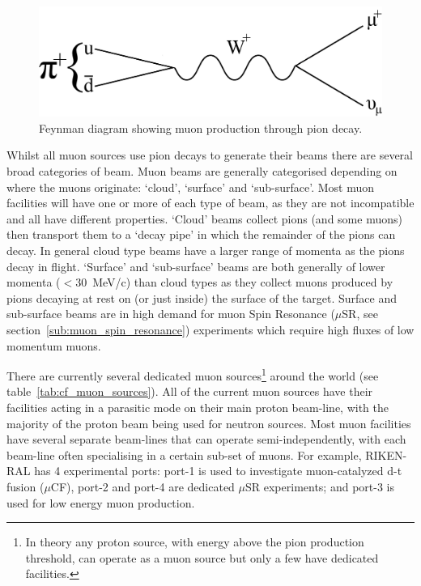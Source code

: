 \begin{figure}[hptb]
  \centering  
    \includegraphics[scale=0.8]{images/pion_decay_feyman.png}
  \caption{Feynman diagram showing muon production through pion decay.}
  \label{fig:pion_decay_feyman}
\end{figure}

Whilst all muon sources use pion decays to generate their beams there are several broad categories of beam. Muon beams are generally categorised depending on where the muons originate: `cloud', `surface' and `sub-surface'. Most muon facilities will have one or more of each type of beam, as they are not incompatible and all have different properties. `Cloud' beams collect pions (and some muons) then transport them to a `decay pipe' in which the remainder of the pions can decay. In general cloud type beams have a larger range of momenta as the pions decay in flight. `Surface' and `sub-surface' beams are both generally of lower momenta (\( <30\)~MeV/c) than cloud types as they collect muons produced by pions decaying at rest on (or just inside) the surface of the target. Surface and sub-surface beams are in high demand for muon Spin Resonance (\(\mu\)SR, see section~\ref{sub:muon_spin_resonance}) experiments which require high fluxes of low momentum muons.

There are currently several dedicated muon sources\footnote{In theory any proton source, with energy above the pion production threshold, can operate as a muon source but only a few have dedicated facilities.} around the world (see table~\ref{tab:cf_muon_sources}). All of the current muon sources have their facilities acting in a parasitic mode on their main proton beam-line, with the majority of the proton beam being used for neutron sources. Most muon facilities have several separate beam-lines that can operate semi-independently, with each beam-line often specialising in a certain sub-set of muons. For example, RIKEN-RAL has 4 experimental ports: port-1 is used to investigate muon-catalyzed d-t fusion (\(\mu\)CF), port-2 and port-4 are dedicated \(\mu\)SR experiments; and port-3 is used for low energy muon production.

